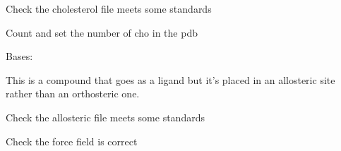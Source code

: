 \documentclass[letterpaper,10pt,english]{sphinxmanual}
\begin{document}
\begin{fulllineitems}
\begin{fulllineitems}
\label{\detokenize{protein:protein.Cholesterol.check_pdb}}
\pysigstartsignatures
{}
\pysigstopsignatures
\sphinxAtStartPar
Check the cholesterol file meets some standards

\end{fulllineitems}


\begin{fulllineitems}
\label{\detokenize{protein:protein.Cholesterol.count_cho}}
\pysigstartsignatures
{}
\pysigstopsignatures
\sphinxAtStartPar
Count and set the number of cho in the pdb

\end{fulllineitems}


\end{fulllineitems}


\begin{fulllineitems}
\label{\detokenize{protein:protein.Alosteric}}
\pysigstartsignatures
{}
\pysigstopsignatures
\sphinxAtStartPar
Bases: {\hyperref[\detokenize{protein:protein.Compound}]{}}

\sphinxAtStartPar
This is a compound that goes as a ligand but it’s placed in an allosteric
site rather than an orthosteric one.

\begin{fulllineitems}
\label{\detokenize{protein:protein.Alosteric.check_pdb}}
\pysigstartsignatures
{}
\pysigstopsignatures
\sphinxAtStartPar
Check the allosteric file meets some standards

\end{fulllineitems}


\begin{fulllineitems}
\label{\detokenize{protein:protein.Alosteric.check_itp}}
\pysigstartsignatures
{}
\pysigstopsignatures
\sphinxAtStartPar
Check the force field is correct

\end{fulllineitems}


\end{fulllineitems}
\end{document}
